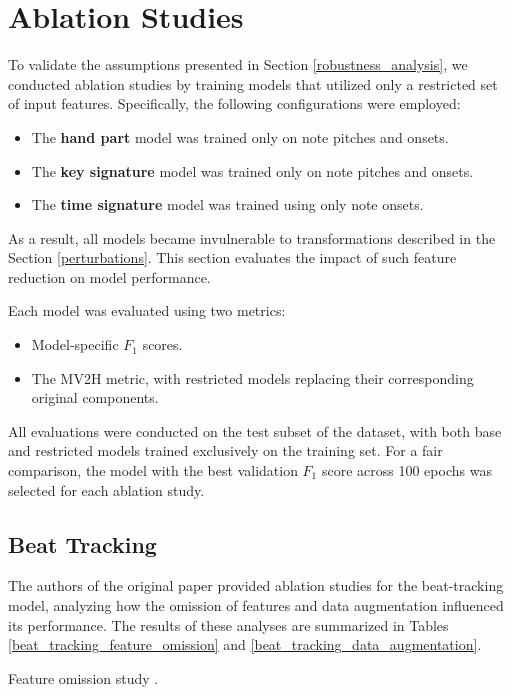 \section{Ablation Studies} \label{ablation_studies}

To validate the assumptions presented in Section \ref{robustness_analysis}, we conducted ablation studies by training models that utilized only a restricted set of input features. Specifically, the following configurations were employed: \begin{itemize}
	\item The \textbf{hand part} model was trained only on note pitches and onsets.
	\item The \textbf{key signature} model was trained only on note pitches and onsets.
	\item The \textbf{time signature} model was trained using only note onsets.
\end{itemize}

As a result, all models became invulnerable to transformations described in the Section \ref{perturbations}. This section evaluates the impact of such feature reduction on model performance.

Each model was evaluated using two metrics:
\begin{itemize} \item Model-specific $F_1$ scores. \item The MV2H metric, with restricted models replacing their corresponding original components. \end{itemize}

All evaluations were conducted on the test subset of the dataset, with both base and restricted models trained exclusively on the training set. For a fair comparison, the model with the best validation $F_1$ score across 100 epochs was selected for each ablation study.

\subsection{Beat Tracking} \label{beat_tracking}

The authors of the original paper provided ablation studies for the beat-tracking model, analyzing how the omission of features and data augmentation influenced its performance. The results of these analyses are summarized in Tables \ref{beat_tracking_feature_omission} and \ref{beat_tracking_data_augmentation}.

\begin{table}[ht!]
\centering

\caption[Feature omission study.]{Feature omission study \cite{Liu2022}.}
\label{beat_tracking_feature_omission}
\end{table}

